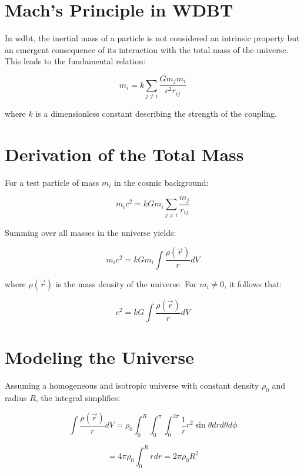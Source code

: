 \section{Mach's Principle in WDBT}
In \gls{wdbt}, the inertial mass of a particle is not considered an intrinsic property but an emergent consequence of its interaction with the total mass of the universe. This leads to the fundamental relation:

\begin{equation}
    m_i = k \sum_{j \neq i} \frac{G m_j m_i}{c^2 r_{ij}}
\end{equation}

where $k$ is a dimensionless constant describing the strength of the coupling.

\section{Derivation of the Total Mass}
For a test particle of mass $m_i$ in the cosmic background:

\begin{equation}
    m_i c^2 = k G m_i \sum_{j \neq i} \frac{m_j}{r_{ij}}
\end{equation}

Summing over all masses in the universe yields:

\begin{equation}
    m_i c^2 = k G m_i \int \frac{\rho(\vec{r})}{r}  dV
\end{equation}

where $\rho(\vec{r})$ is the mass density of the universe. For $m_i \ne 0$, it follows that:

\begin{equation}
    c^2 = k G \int \frac{\rho(\vec{r})}{r}  dV
\end{equation}

\section{Modeling the Universe}
Assuming a homogeneous and isotropic universe with constant density $\rho_0$ and radius $R$, the integral simplifies:

\begin{equation}
    \int \frac{\rho(\vec{r})}{r}  dV = \rho_0 \int_0^R \int_0^\pi \int_0^{2\pi} \frac{1}{r} r^2 \sin\theta  dr d\theta d\phi
\end{equation}

\begin{equation}
    = 4\pi \rho_0 \int_0^R r  dr = 2\pi \rho_0 R^2
\end{equation}


